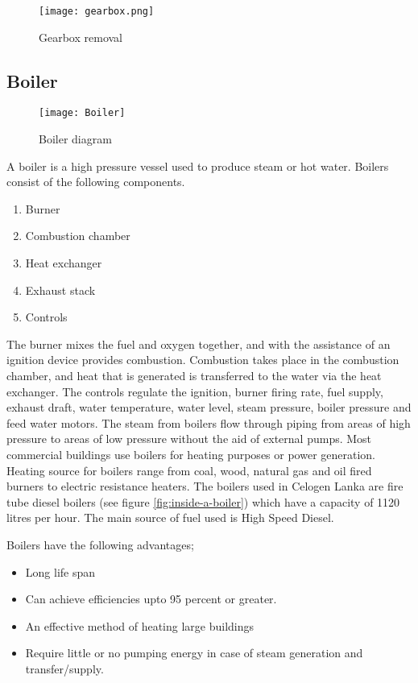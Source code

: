 \documentclass[a4paper,12pt]{article}
\begin{document}
			\begin{figure}[H]
				\centering
				\texttt{[image: gearbox.png]}
				\caption{Gearbox removal}
				\label{fig:gearbox}
			\end{figure}
			
		\newpage
		\subsection{Boiler}
		
			\begin{figure}[H]
				\centering				
					\texttt{[image: Boiler]}
				
				\caption{Boiler diagram}
				\label{fig:Boiler diagram}
			\end{figure}
			A boiler is a high pressure vessel used to produce steam or hot water.
			Boilers consist of the following components.
			\begin{enumerate}
				\item Burner
				\item Combustion chamber
				\item Heat exchanger
				\item Exhaust stack
				\item Controls
			\end{enumerate}
			 The burner mixes the fuel and oxygen together, and with the assistance of an ignition device provides combustion. Combustion takes place in the combustion chamber, and heat that is generated is transferred to the water via the heat exchanger. The controls regulate the ignition, burner firing rate, fuel supply, exhaust draft, water temperature, water level, steam pressure, boiler pressure and feed water motors. The steam from boilers flow through piping from areas of high pressure to areas of low pressure without the aid of external pumps. Most commercial buildings use boilers for heating purposes or power generation. Heating source for boilers range from coal, wood, natural gas and oil fired burners to electric resistance heaters. The boilers used in Celogen Lanka are fire tube diesel boilers (see figure \ref{fig:inside-a-boiler}) which have a capacity of 1120 litres per hour. The main source of fuel used is High Speed Diesel.
			 
			 \newpage			  
			 Boilers have the following advantages;
			 \begin{itemize}
				\item Long life span
				\item Can achieve efficiencies upto 95 percent or greater.
				\item An effective method of heating large buildings
				\item Require little or no pumping energy in case of steam generation and transfer/supply.			 
			 \end{itemize}
			 
\end{document}
